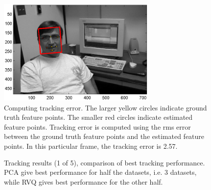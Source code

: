 \begin{Body}
								\begin{figure}[t]
								\centering
								\includegraphics[width=0.7\textwidth]{thesis/results_pca__trk_dudek_0007.png}
								\caption{Computing tracking error.  The larger yellow circles indicate ground truth feature points.  The smaller red circles indicate estimated feature points.  Tracking error is computed using the rms error between the ground truth feature points and the estimated feature points.  In this particular frame, the tracking error is 2.57.}
								\label{fig:results_pca__trk_dudek_0007}
								\end{figure}

								\begin{figure}[t]
								\centering
								
								\caption{Tracking results (1 of 5), comparison of best tracking performance.  PCA give best performance for half the datasets, i.e. 3 datasets, while RVQ gives best performance for the other half.}
								\label{fig:results_final_1_best}
								\end{figure}


\end{Body}
